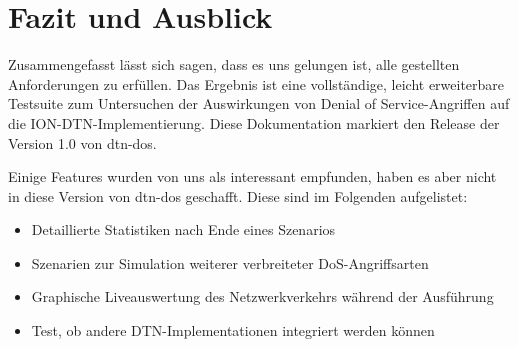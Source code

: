 \documentclass{article}
\begin{document}
\section{Fazit und Ausblick}
Zusammengefasst lässt sich sagen, dass es uns gelungen ist, alle gestellten Anforderungen zu erfüllen. Das Ergebnis ist eine vollständige, leicht erweiterbare Testsuite zum Untersuchen der Auswirkungen von Denial of Service-Angriffen auf die ION-DTN-Implementierung. Diese Dokumentation markiert den Release der Version 1.0 von dtn-dos.\par
Einige Features wurden von uns als interessant empfunden, haben es aber nicht in diese Version von dtn-dos geschafft. Diese sind im Folgenden aufgelistet:
\begin{itemize}
    \item Detaillierte Statistiken nach Ende eines Szenarios
    \item Szenarien zur Simulation weiterer verbreiteter DoS-Angriffsarten
    \item Graphische Liveauswertung des Netzwerkverkehrs während der Ausführung
    \item Test, ob andere DTN-Implementationen integriert werden können
\end{itemize}


\newpage
\printbibliography
\end{document}
